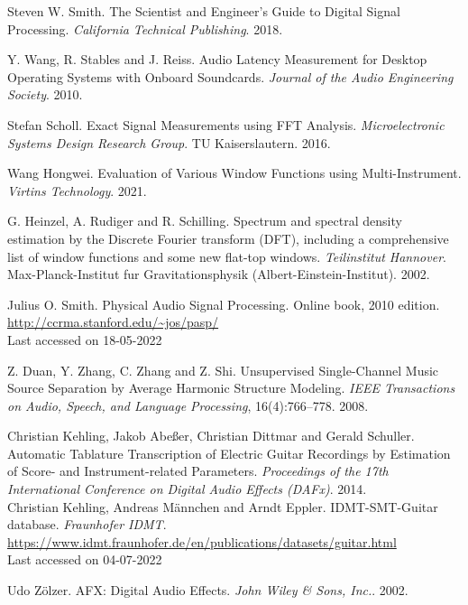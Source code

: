 \documentclass[a4paper,10pt,twocolumn]{article}
\begin{document}
\begin{thebibliography}{XX}
Steven W. Smith. The Scientist and Engineer's Guide to Digital Signal Processing. \textit{California Technical Publishing}. 2018.

Y. Wang, R. Stables and J. Reiss. Audio Latency Measurement for Desktop Operating Systems with Onboard Soundcards. \textit{Journal of the Audio Engineering Society}. 2010.


Stefan Scholl. Exact Signal Measurements using FFT Analysis. \textit{Microelectronic Systems Design Research Group}. TU Kaiserslautern. 2016.

Wang Hongwei. Evaluation of Various Window Functions using Multi-Instrument. \textit{Virtins Technology}. 2021.

G. Heinzel, A. Rudiger and R. Schilling. Spectrum and spectral density estimation by the Discrete Fourier transform (DFT), including a comprehensive list of window functions and some new flat-top windows. \textit{Teilinstitut Hannover}. Max-Planck-Institut fur Gravitationsphysik (Albert-Einstein-Institut). 2002.

Julius O. Smith. Physical Audio Signal Processing. Online book, 2010 edition.\\
\url{http://ccrma.stanford.edu/~jos/pasp/}\\
Last accessed on 18-05-2022

Z. Duan, Y. Zhang, C. Zhang and Z. Shi. Unsupervised Single-Channel Music Source Separation by Average Harmonic Structure Modeling. \textit{IEEE Transactions on Audio, Speech, and Language Processing}, 16(4):766--778. 2008.

Christian Kehling, Jakob Abeßer, Christian Dittmar and Gerald Schuller. Automatic Tablature Transcription of Electric Guitar Recordings by Estimation of Score- and Instrument-related Parameters. \textit{Proceedings of the 17th International Conference on Digital Audio Effects (DAFx)}. 2014.\\

Christian Kehling, Andreas Männchen and Arndt Eppler. IDMT-SMT-Guitar database. \textit{Fraunhofer IDMT}.\\
\url{https://www.idmt.fraunhofer.de/en/publications/datasets/guitar.html}\\
Last accessed on 04-07-2022

Udo Zölzer. AFX: Digital Audio Effects. \textit{John Wiley \& Sons, Inc.}. 2002.
\end{thebibliography}

% 
% 
\end{document}
